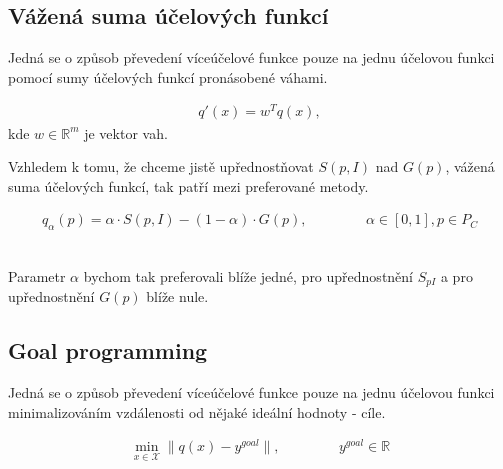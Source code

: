 
\subsection{Vážená suma účelových funkcí}

Jedná se o způsob převedení víceúčelové funkce pouze na jednu účelovou funkci pomocí sumy účelových funkcí pronásobené váhami.

\begin{definice}
  \begin{align}
    q'(x) = w^T q(x),
  \end{align}
  kde $w \in \mathbb{R}^m$ je vektor vah.
  \\
\end{definice}

Vzhledem k tomu, že chceme jistě upřednostňovat $S(p, I)$ nad $G(p)$, vážená suma účelových funkcí, tak patří mezi preferované metody.

\begin{definice}
  \begin{align}
    q_{\alpha}(p) = \alpha \cdot S(p, I) - (1 - \alpha) \cdot G(p), \hspace{50pt} \alpha \in [0, 1], p \in P_C
  \end{align}
  \\
\end{definice}

Parametr $\alpha$ bychom tak preferovali blíže jedné, pro upřednostnění $S_{pI}$ a pro upřednostnění $G(p)$ blíže nule.

\subsection{Goal programming}

Jedná se o způsob převedení víceúčelové funkce pouze na jednu účelovou funkci minimalizováním vzdálenosti od nějaké ideální hodnoty - cíle. 

\begin{definice}
  \begin{align}
    \min_{x \in \mathcal{X}} \| q(x) - y^{goal} \|, \hspace{50pt} y^{goal} \in \mathbb{R}
  \end{align}
  \\
\end{definice}

